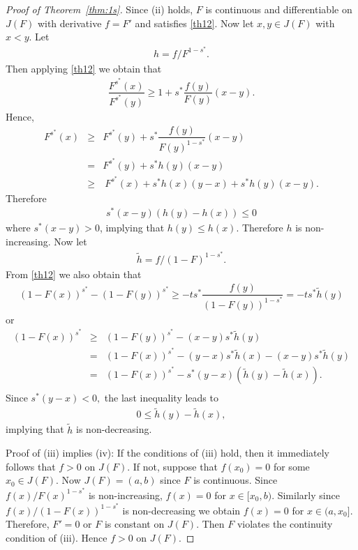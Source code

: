 \documentclass[11pt]{amsart}
\numberwithin{equation}{section}
\theoremstyle{definition}\newtheorem{definition}{Definition}
\theoremstyle{remark}\newtheorem{assumption}{Assumption}
\theoremstyle{remark}\newtheorem{remark}{Remark}
\theoremstyle{definition}\newtheorem{example}{Example}
\theoremstyle{plain}\newtheorem{question}{Question}
\theoremstyle{plain}\newtheorem{theorem}{Theorem}
\theoremstyle{plain}\newtheorem{lemma}{Lemma}
\theoremstyle{plain}\newtheorem{proposition}{Proposition}
\theoremstyle{plain}\newtheorem{corollary}{Corollary}
\theoremstyle{plain}\newtheorem{conjecture}{Conjecture}
\begin{document}
\begin{proof}[Proof of Theorem~\ref{thm:1s}]
Since
    (ii) holds, $F$ is continuous and differentiable on $J(F)$ with derivative $f=F'$ 
    and satisfies \eqref{th12}. Now let $x,y\in J(F)$ with $x<y.$  
    Let 
\begin{eqnarray}
    h=f/F^{1-s^*}.
    \label{defh}
\end{eqnarray} 
    Then applying \eqref{th12} we obtain that
\begin{eqnarray*}
    \dfrac{F^{s^*}(x)}{F^{s^*}(y)}\geq 1+s^*\dfrac{f(y)}{F(y)}(x-y).
\end{eqnarray*}
    Hence, 
\begin{eqnarray*}
    F^{s^*}(x)
    & \geq & F^{s^*}(y)+s^*\dfrac{f(y)}{F(y)^{1-s^*}}(x-y)\\
    & = &  F^{s^*}(y)+s^*h(y)(x-y)\\
    &\geq & \ F^{s^*}(x)+s^*h(x)(y-x)+s^*h(y)(x-y).
\end{eqnarray*}
    Therefore 
\begin{eqnarray*}
    s^{*}(x-y)(h(y)-h(x))\leq 0
\end{eqnarray*} 
    where $s^{*}(x-y)>0$,  implying that $h(y)\leq h(x)$. 
    Therefore $h$ is non-increasing. Now let 
\begin{eqnarray}
    \tilde{h}=f/(1-F)^{1-s^{*}}. \label{defth}
\end{eqnarray} 
     From \eqref{th12} we also obtain that 
\begin{eqnarray*}
    (1-F(x))^{s^{*}}-(1-F(y))^{s^*}\geq -ts^{*}\dfrac{f(y)}{(1-F(y))^{1-s^*}}=-ts^{*}\tilde{h}(y)
\end{eqnarray*}
    or
\begin{eqnarray*}
      (1-F(x))^{s^{*}}& \geq & (1-F(y))^{s^*}  -(x-y)s^{*}\tilde{h}(y)\\
         & = & (1-F(x))^{s^*}-(y-x)s^{*}\tilde{h}(x)  -(x-y)s^{*}\tilde{h}(y)\\
         & = & (1-F(x))^{s^*}-s^{*}(y-x)(\tilde{h}(y)-\tilde{h}(x) ).\\
\end{eqnarray*}
    Since $s^{*}(y-x)<0,$ the last inequality leads to
\begin{eqnarray*}
    0\leq \tilde{h}(y)-\tilde{h}(x), 
\end{eqnarray*} 
    implying that $\tilde{h}$ is non-decreasing. 

Proof of (iii) implies (iv): 
   If the conditions of (iii) hold, then it immediately follows that $f>0$ on $J(F)$. 
    If not, suppose that $f(x_0) = 0$ for some $x_0\in J(F)$.  Now $J(F)=(a,b)$ since $F$ is continuous.
    Since $f(x)/F(x)^{1-s^*}$ is non-increasing, 
    $f(x)=0$ for $x\in [x_0,b).$ Similarly since $f(x)/(1-F(x))^{1-s^*}$ is non-decreasing 
    we obtain $f(x)=0$ for $x\in(a, x_0].$ 
    Therefore, $F'=0$  or $F$ is constant on $J(F)$. Then $F$ violates the continuity 
    condition of (iii). Hence $f>0$ on $J(F)$.  
  

\end{proof}
\end{document}
